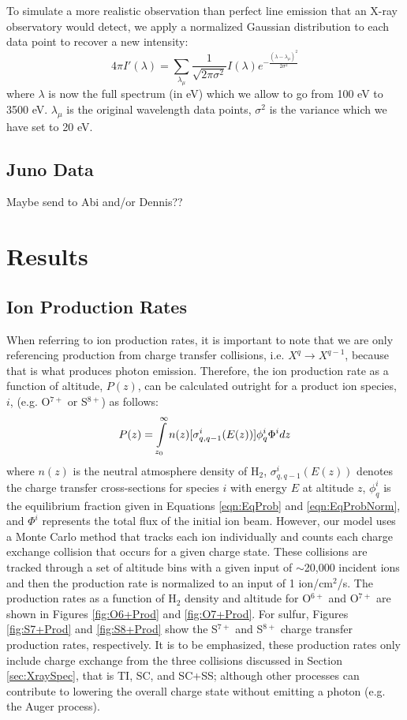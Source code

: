 \documentclass[draft]{agujournal2018}
\begin{document}
To simulate a more realistic observation than perfect line emission that an X-ray observatory would detect, we apply a normalized Gaussian distribution to each data point to recover a new intensity:
\begin{equation}
    4\pi I'(\lambda)=\sum_{\lambda_{\mu}}\frac{1}{\sqrt{2\pi\sigma^2}}I(\lambda)e^{-\frac{(\lambda-\lambda_{\mu})^2}{2\sigma^2}}
\end{equation}
where $\lambda$ is now the full spectrum (in eV) which we allow to go from 100 eV to 3500 eV. $\lambda_{\mu}$ is the original wavelength data points, $\sigma^2$ is the variance which we have set to 20 eV.

\subsection{Juno Data}

Maybe send to Abi and/or Dennis??

\section{Results}

\subsection{Ion Production Rates}

When referring to ion production rates, it is important to note that we are only referencing production from charge transfer collisions, i.e. $X^q \rightarrow X^{q-1}$, because that is what produces photon emission.
Therefore, the ion production rate as a function of altitude, $P(z)$, can be calculated outright for a product ion species, $i$, (e.g. O$^{7+}$ or S$^{8+}$) as follows:
\begin{equation}
    P(z)=\int\displaylimits_{z_0}^{\infty}n(z)[\sigma_{q,q-1}^i(E(z))]\phi_q^i\Phi^idz
\end{equation}
where $n(z)$ is the neutral atmosphere density of H$_2$, $\sigma_{q,q-1}^i(E(z))$ denotes the charge transfer cross-sections for species $i$ with energy $E$ at altitude $z$, $\phi_q^i$ is the equilibrium fraction given in Equations \ref{eqn:EqProb} and \ref{eqn:EqProbNorm}, and $\Phi^i$ represents the total flux of the initial ion beam.
However, our model uses a Monte Carlo method that tracks each ion individually and counts each charge exchange collision that occurs for a given charge state.
These collisions are tracked through a set of altitude bins with a given input of $\sim$20,000 incident ions and then the production rate is normalized to an input of 1 ion/cm$^2$/s.
The production rates as a function of H$_2$ density and altitude for O$^{6+}$ and O$^{7+}$ are shown in Figures \ref{fig:O6+Prod} and \ref{fig:O7+Prod}.
For sulfur, Figures \ref{fig:S7+Prod} and \ref{fig:S8+Prod} show the S$^{7+}$ and S$^{8+}$ charge transfer production rates, respectively.
It is to be emphasized, these production rates only include charge exchange from the three collisions discussed in Section \ref{sec:XraySpec}, that is TI, SC, and SC+SS; although other processes can contribute to lowering the overall charge state without emitting a photon (e.g. the Auger process).
\end{document}
